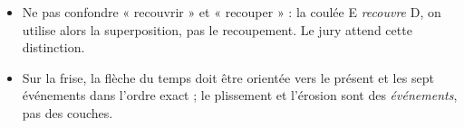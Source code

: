 \documentclass[11pt]{article}
\begin{document}
\begin{attention}
\begin{itemize}
\item Ne pas confondre « recouvrir » et « recouper » : la coulée E \emph{recouvre} D, on utilise alors la superposition, pas le recoupement. Le jury attend cette distinction.
\item Sur la frise, la flèche du temps doit être orientée vers le présent et les sept événements dans l'ordre exact ; le plissement et l'érosion sont des \emph{événements}, pas des couches.
\end{itemize}
\end{attention}

\begin{corrige}


\end{corrige}
\end{document}
